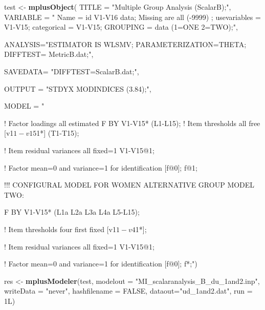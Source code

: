 \documentclass[]{book}
\newenvironment{Shaded}{\begin{snugshade}}{\end{snugshade}}
\newcommand{\DataTypeTok}[1]{\textcolor[rgb]{0.13,0.29,0.53}{#1}}
\newcommand{\KeywordTok}[1]{\textcolor[rgb]{0.13,0.29,0.53}{\textbf{#1}}}
\newcommand{\NormalTok}[1]{#1}
\newcommand{\OtherTok}[1]{\textcolor[rgb]{0.56,0.35,0.01}{#1}}
\newcommand{\StringTok}[1]{\textcolor[rgb]{0.31,0.60,0.02}{#1}}
\begin{document}
\begin{Shaded}
\begin{Highlighting}[]
\NormalTok{test <-}\StringTok{ }\KeywordTok{mplusObject}\NormalTok{(}
\DataTypeTok{TITLE =} \StringTok{"Multiple Group Analysis (ScalarB);"}\NormalTok{,}
\DataTypeTok{VARIABLE =} \StringTok{"}
\StringTok{Name = id V1-V16 data;}
\StringTok{Missing are all (-9999) ;}
\StringTok{usevariables = V1-V15;}
\StringTok{categorical = V1-V15;}
\StringTok{GROUPING = data (1=ONE 2=TWO);"}\NormalTok{,}

\DataTypeTok{ANALYSIS=}\StringTok{"ESTIMATOR IS WLSMV; }
\StringTok{PARAMETERIZATION=THETA;}
\StringTok{DIFFTEST= MetricB.dat;"}\NormalTok{,}

\DataTypeTok{SAVEDATA=} \StringTok{"DIFFTEST=ScalarB.dat;"}\NormalTok{,}

\DataTypeTok{OUTPUT =} \StringTok{"STDYX MODINDICES (3.84);"}\NormalTok{,}

\DataTypeTok{MODEL =} \StringTok{" }

\StringTok{! Factor loadings all estimated         }
\StringTok{ F BY V1-V15* (L1-L15);}
\StringTok{       }
\StringTok{! Item thresholds all free     }
\StringTok{[v1$1-v15$1*] (T1-T15);    }

\StringTok{! Item residual variances all fixed=1     }
\StringTok{V1-V15@1; }

\StringTok{! Factor mean=0 and variance=1 for identification }
\StringTok{[f@0]; f@1; }

\StringTok{!!! CONFIGURAL MODEL FOR WOMEN ALTERNATIVE GROUP      }
\StringTok{MODEL TWO:        }

\StringTok{F BY V1-V15* (L1a L2a L3a L4a L5-L15);}

\StringTok{! Item thresholds four first fixed   }
\StringTok{[v1$1-v4$1*];}

\StringTok{! Item residual variances all fixed=1     }
\StringTok{V1-V15@1; }

\StringTok{! Factor mean=0 and variance=1 for identification }
\StringTok{[f@0]; f*;"}\NormalTok{)}

\NormalTok{res <-}\StringTok{ }\KeywordTok{mplusModeler}\NormalTok{(test, }\DataTypeTok{modelout =} \StringTok{"MI_scalaranalysis_B_du_1and2.inp"}\NormalTok{, }
                    \DataTypeTok{writeData =} \StringTok{"never"}\NormalTok{, }
                    \DataTypeTok{hashfilename =} \OtherTok{FALSE}\NormalTok{, }
                    \DataTypeTok{dataout=}\StringTok{"ud_1and2.dat"}\NormalTok{, }\DataTypeTok{run =}\NormalTok{ 1L)}
\end{Highlighting}
\end{Shaded}
\end{document}
